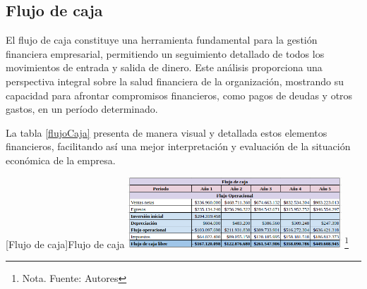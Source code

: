 \subsection{Flujo de caja}

El flujo de caja constituye una herramienta fundamental para la gestión financiera empresarial, permitiendo un seguimiento detallado de todos los movimientos de entrada y salida de dinero. Este análisis proporciona una perspectiva integral sobre la salud financiera de la organización, mostrando su capacidad para afrontar compromisos financieros, como pagos de deudas y otros gastos, en un período determinado.

La tabla \ref{flujoCaja} presenta de manera visual y detallada estos elementos financieros, facilitando así una mejor interpretación y evaluación de la situación económica de la empresa.

\vspace{2mm}
\begin{minipage}{0.8\textwidth}
\centering
{}[{Flujo de caja}]{Flujo de caja}
\label{flujoCaja}
\includegraphics[width=0.6\textwidth]{Content/Images/AF/FlujoDeCaja.png}
\footnote{Nota. \textup{Fuente: Autores}}
\end{minipage}
\newpage
